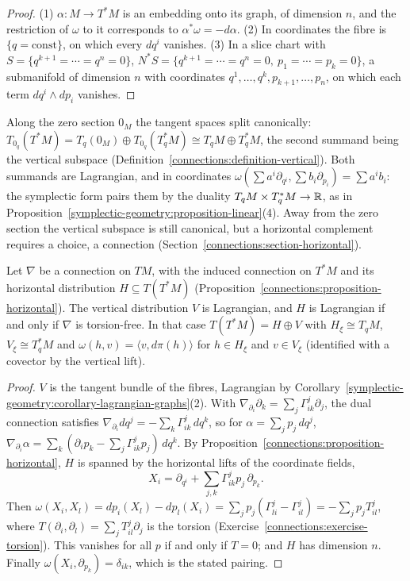 \begin{proof}
(1) $\alpha \colon M \to T^*M$ is an embedding onto its graph, of dimension $n$, and the restriction of $\omega$ to it corresponds to $\alpha^*\omega = -d\alpha$. (2) In coordinates the fibre is
$\{q = \text{const}\}$, on which every $dq^i$ vanishes. (3) In a slice chart with $S = \{q^{k+1} = \cdots = q^n = 0\}$, $N^*S = \{q^{k+1} = \cdots = q^n = 0, \ p_1 = \cdots = p_k = 0\}$, a submanifold of dimension
$n$ with coordinates $q^1, \ldots, q^k, p_{k+1}, \ldots, p_n$, on which each term $dq^i \wedge dp_i$ vanishes.
\end{proof}

Along the zero section $0_M$ the tangent spaces split canonically: $T_{0_q}(T^*M) = T_q(0_M) \oplus T_{0_q}(T^*_qM) \cong T_qM \oplus T^*_qM$, the second summand being the vertical subspace
(Definition~\ref{connections:definition-vertical}). Both summands are Lagrangian, and in coordinates $\omega(\sum a^i\partial_{q^i}, \sum b_i\partial_{p_i}) = \sum a^ib_i$: the symplectic form pairs them by the
duality $T_qM \times T_q^*M \to \mathbb{R}$, as in Proposition~\ref{symplectic-geometry:proposition-linear}(4). Away from the zero section the vertical subspace is still canonical, but a horizontal complement requires a
choice, a connection (Section~\ref{connections:section-horizontal}).

\begin{proposition}\label{symplectic-geometry:proposition-connection-lagrangian}
Let $\nabla$ be a connection on $TM$, with the induced connection on $T^*M$ and its horizontal distribution $H \subseteq T(T^*M)$ (Proposition~\ref{connections:proposition-horizontal}). The vertical
distribution $V$ is Lagrangian, and $H$ is Lagrangian if and only if $\nabla$ is torsion-free. In that case $T(T^*M) = H \oplus V$ with $H_\xi \cong T_qM$, $V_\xi \cong T^*_qM$ and
$\omega(h, v) = \langle v, d\pi(h)\rangle$ for $h \in H_\xi$ and $v \in V_\xi$ (identified with a covector by the vertical lift).
\end{proposition}

\begin{proof}
$V$ is the tangent bundle of the fibres, Lagrangian by Corollary~\ref{symplectic-geometry:corollary-lagrangian-graphs}(2). With $\nabla_{\partial_i}\partial_k = \sum_j\Gamma^j_{ik}\partial_j$, the dual connection
satisfies $\nabla_{\partial_i}dq^j = -\sum_k\Gamma^j_{ik}\,dq^k$, so for $\alpha = \sum_jp_j\,dq^j$, $\nabla_{\partial_i}\alpha = \sum_k(\partial_ip_k - \sum_j\Gamma^j_{ik}p_j)\,dq^k$. By
Proposition~\ref{connections:proposition-horizontal}, $H$ is spanned by the horizontal lifts of the coordinate fields,
\[
X_i = \partial_{q^i} + \sum_{j,k}\Gamma^j_{ik}p_j\,\partial_{p_k}.
\]
Then $\omega(X_i, X_l) = dp_i(X_l) - dp_l(X_i) = \sum_jp_j(\Gamma^j_{li} - \Gamma^j_{il}) = -\sum_jp_jT^j_{il}$, where $T(\partial_i, \partial_l) = \sum_jT^j_{il}\partial_j$ is the torsion
(Exercise~\ref{connections:exercise-torsion}). This vanishes for all $p$ if and only if $T = 0$; and $H$ has dimension $n$. Finally $\omega(X_i, \partial_{p_k}) = \delta_{ik}$, which is the stated pairing.
\end{proof}

